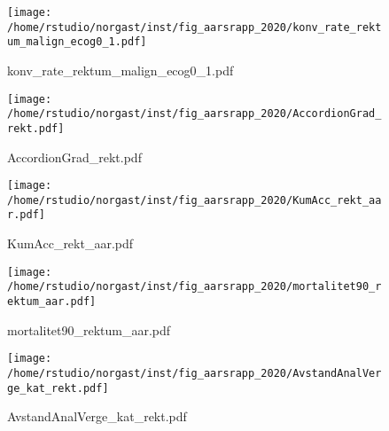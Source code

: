 \documentclass[norsk,a4paper]{article}\usepackage[]{graphicx}\usepackage[]{color}
\begin{document}
\begin{figure}[ht]
\centering
\texttt{[image: /home/rstudio/norgast/inst/fig\_aarsrapp\_2020/konv\_rate\_rektum\_malign\_ecog0\_1.pdf]}
\caption{konv\_rate\_rektum\_malign\_ecog0\_1.pdf}
\end{figure}

\begin{figure}[ht]
\centering
\texttt{[image: /home/rstudio/norgast/inst/fig\_aarsrapp\_2020/AccordionGrad\_rekt.pdf]}
\caption{AccordionGrad\_rekt.pdf}
\end{figure}

\begin{figure}[ht]
\centering
\texttt{[image: /home/rstudio/norgast/inst/fig\_aarsrapp\_2020/KumAcc\_rekt\_aar.pdf]}
\caption{KumAcc\_rekt\_aar.pdf}
\end{figure}


\begin{figure}[ht]
\centering
\texttt{[image: /home/rstudio/norgast/inst/fig\_aarsrapp\_2020/mortalitet90\_rektum\_aar.pdf]}
\caption{mortalitet90\_rektum\_aar.pdf}
\end{figure}

\begin{figure}[ht]
\centering
\texttt{[image: /home/rstudio/norgast/inst/fig\_aarsrapp\_2020/AvstandAnalVerge\_kat\_rekt.pdf]}
\caption{AvstandAnalVerge\_kat\_rekt.pdf}
\end{figure}
\end{document}
